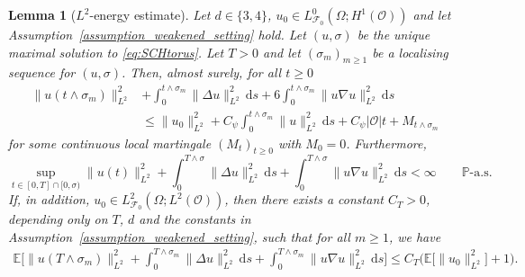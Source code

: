 \documentclass[reqno]{amsart}
\newtheorem{lemma}[Satz]{Lemma}
\newcommand{\E}{\mathbb{E}}
\newcommand{\F}{\mathscr{F}}
\newcommand{\sO}{\mathscr{O}}
\newcommand{\1}{\mathbf{1}}
\newcommand{\grad}{\nabla}
\newcommand{\ds}{\,\mathrm{d}s}
\newcommand{\inttm}{\int_0^{t\wedge\sigma_m}}
\begin{document}
 \begin{lemma}[$L^2$-energy estimate]
    \label{lem:L2energyEstimate}
        Let $d\in\{3,4\}$, $u_0\in L^0_{\F_0}(\Omega; H^1(\sO))$  and let Assumption~\ref{assumption_weakened_setting} hold. Let $(u,\sigma)$ be the unique 			maximal solution to \eqref{eq:SCHtorus}. Let $T>0$ and let $(\sigma_m)_{m\geq 1}$ be a localising sequence for $(u,\sigma)$. Then, almost surely, for all $t\geq 0$
        \begin{align}\label{eq:lemL2energyEstimate-martingaleEq}
         \|u(t\wedge\sigma_m)\|_{L^2}^2 &+ \inttm \|\Delta u\|^2_{L^2}\ds + 6  \inttm \|u \grad u\|_{L^2}^2 \ds \nonumber\\
         &\le \|u_0\|_{L^2}^2 + C_{\psi} \inttm \|u\|_{L^2}^2\ds +C_\psi|\sO|t
        +M_{t \land \sigma_m}
        \end{align}
        for some continuous local martingale $(M_t)_{t\geq 0}$ with $M_0=0$. Furthermore, 
        \begin{equation}
        \label{eq:L2energyEstimateAS}
         \sup_{t\in[0,T]\cap[0,\sigma)} \|u(t)\|_{L^2}^2  +  \int_0^{T\wedge \sigma} \|\Delta u\|_{L^2}^2\ds +  \int_0^{T\wedge \sigma}  \|u\grad u\|_{L^2}^2\ds  < \infty  \qquad \mathbb{P}\text{-a.s.}
    \end{equation}
    If, in addition, $u_0 \in L_{\F_0}^2(\Omega; L^2(\sO))$, then there exists a constant $C_T>0$, depending only on $T$, $d$ and the constants in Assumption~\ref{assumption_weakened_setting}, such that for all $m \geq 1$, we have
    \begin{align}
    \label{eq:L2energyEstimateMoment}
        \E\Big[ \|u(T\wedge\sigma_m)\|^2_{L^2} + \int_0^{T\wedge\sigma_m} \|\Delta u\|_{L^2}^2 \ds+ \int_0^{T\wedge\sigma_m} \|u\grad u\|_{L^2}^2\ds\Big]
        \leq C_T\big(\E\big[\|u_0\|_{L^2}^2\big]+1\big).
    \end{align}
    \end{lemma}
   
\end{document}
